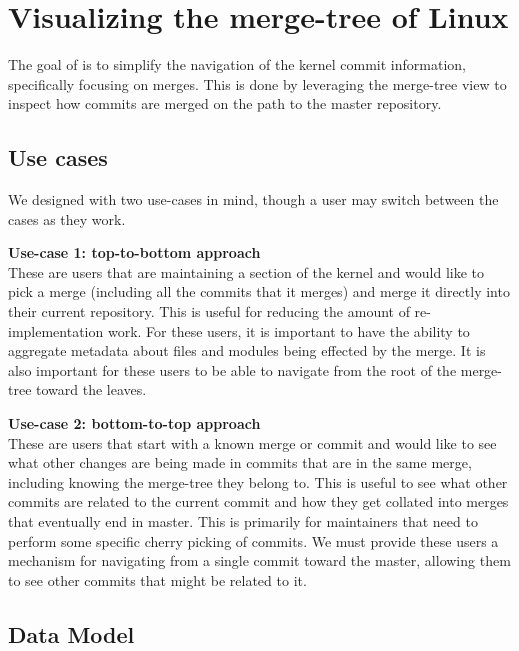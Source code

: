 \documentclass[conference, draftclsnofoot, draft]{IEEEtran}
\begin{document}
\section{Visualizing the merge-tree of Linux}

The goal of \tool is to simplify the navigation of the kernel commit information,
specifically focusing on merges. This is done by leveraging the merge-tree view to
inspect how commits are merged on the path to the master repository.

\subsection{Use cases}

We designed \tool with two use-cases in mind, though a user may switch between the
cases as they work.

\noindent \textbf{Use-case 1: top-to-bottom approach}\label{sec:usecase1}\\
These are users that are maintaining a section of the kernel and would like to pick
a merge (including all the commits that it merges) and merge it directly into their
current repository. This is useful for reducing the amount of re-implementation
work. For these users, it is important to have the ability to aggregate metadata
about files and modules being effected by the merge.  It is also important for these
users to be able to navigate from the root of the merge-tree toward the leaves.

\noindent \textbf{Use-case 2: bottom-to-top approach}\label{sec:usecase2}\\
These are users that start with a known merge or commit and would like to see what
other changes are being made in commits that are in the same merge, including
knowing the merge-tree they belong to. This is useful to see what other commits are
related to the current commit and how they get collated into merges that eventually
end in master.  This is primarily for maintainers that need to perform some specific
cherry picking of commits. We must provide these users a mechanism for navigating
from a single commit toward the master, allowing them to see other commits that
might be related to it.

\subsection{Data Model}
\end{document}
